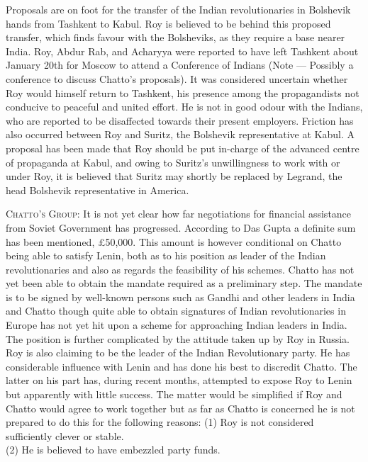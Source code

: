 Proposals are on foot for the transfer of the Indian revolutionaries in Bolshevik hands from Tashkent to Kabul. Roy is believed to be behind this proposed transfer, which finds favour with the Bolsheviks, as they require a base nearer India. Roy, Abdur Rab, and Acharyya were reported to have left Tashkent about January 20th for Moscow to attend a Conference of Indians (Note — Possibly a conference to discuss Chatto’s proposals). It was considered uncertain whether Roy would himself return to Tashkent, his presence among the propagandists not conducive to peaceful and united effort. He is not in good odour with the Indians, who are reported to be disaffected towards their present employers. Friction has also occurred between Roy and Suritz, the Bolshevik representative at Kabul. A proposal has been made that Roy should be put in-charge of the advanced centre of propaganda at Kabul, and owing to Suritz’s unwillingness to work with or under Roy, it is believed that Suritz may shortly be replaced by Legrand, the head Bolshevik representative in America. 

\textsc{Chatto’s Group:} It is not yet clear how far negotiations for financial assistance from Soviet Government has progressed. According to Das Gupta a definite sum has been mentioned, £50,000. This amount is however conditional on Chatto being able to satisfy Lenin, both as to his position as leader of the Indian revolutionaries and also as regards the feasibility of his schemes. Chatto has not yet been able to obtain the mandate required as a preliminary step. The mandate is to be signed by well-known persons such as Gandhi and other leaders in India and Chatto though quite able to obtain signatures of Indian revolutionaries in Europe has not yet hit upon a scheme for approaching Indian leaders in India. The position is further complicated by the attitude taken up by Roy in Russia. Roy is also claiming to be the leader of the Indian Revolutionary party. He has considerable influence with Lenin and has done his best to discredit Chatto. The latter on his part has, during recent months, attempted to expose Roy to Lenin but apparently with little success. The matter would be simplified if Roy and Chatto would agree to work together but as far as Chatto is concerned he is not prepared to do this for the following reasons: 
\indent(1) Roy is not considered sufficiently clever or stable. \\
\indent(2) He is believed to have embezzled party funds. \\
[Note:— This last accusation was brought against him by the Indians in America with whom he worked before his flight to Mexico.] 

